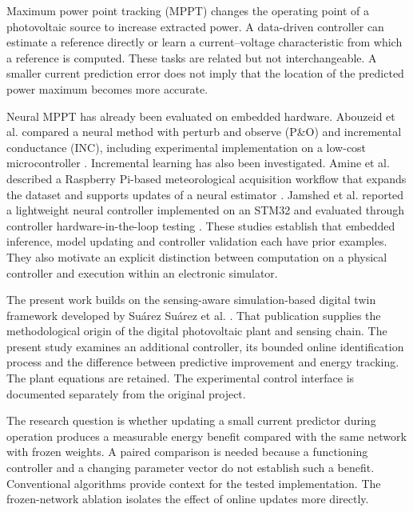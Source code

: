 
Maximum power point tracking (MPPT) changes the operating point of a photovoltaic source to increase extracted power. A data-driven controller can estimate a reference directly or learn a current--voltage characteristic from which a reference is computed. These tasks are related but not interchangeable. A smaller current prediction error does not imply that the location of the predicted power maximum becomes more accurate.

Neural MPPT has already been evaluated on embedded hardware. Abouzeid et al. compared a neural method with perturb and observe (P\&O) and incremental conductance (INC), including experimental implementation on a low-cost microcontroller \cite{abouzeid}. Incremental learning has also been investigated. Amine et al. described a Raspberry Pi-based meteorological acquisition workflow that expands the dataset and supports updates of a neural estimator \cite{amine}. Jamshed et al. reported a lightweight neural controller implemented on an STM32 and evaluated through controller hardware-in-the-loop testing \cite{jamshed}. These studies establish that embedded inference, model updating and controller validation each have prior examples. They also motivate an explicit distinction between computation on a physical controller and execution within an electronic simulator.

The present work builds on the sensing-aware simulation-based digital twin framework developed by Suárez Suárez et al. \cite{suarez}. That publication supplies the methodological origin of the digital photovoltaic plant and sensing chain. The present study examines an additional controller, its bounded online identification process and the difference between predictive improvement and energy tracking. The plant equations are retained. The experimental control interface is documented separately from the original project.

The research question is whether updating a small current predictor during operation produces a measurable energy benefit compared with the same network with frozen weights. A paired comparison is needed because a functioning controller and a changing parameter vector do not establish such a benefit. Conventional algorithms provide context for the tested implementation. The frozen-network ablation isolates the effect of online updates more directly.

